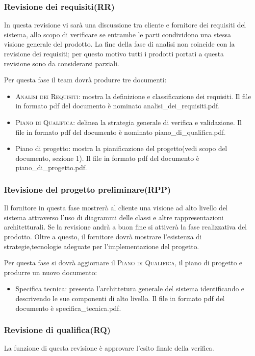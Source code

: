 \documentclass[11pt,a4paper]{article}
\begin{document}
\subsubsection{Revisione dei requisiti(RR)}
In questa revisione vi sarà una discussione tra cliente e fornitore dei requisiti del sistema, allo scopo di verificare se entrambe le parti condividono una stessa visione generale del prodotto.
La fine della fase di analisi non coincide con la revisione dei requisiti; per questo motivo tutti i prodotti portati a questa revisione sono da considerarsi parziali.

Per questa fase il team dovrà produrre tre documenti:
\begin{itemize}
\item \textsc{Analisi dei Requisiti}: mostra la definizione e classificazione dei requisiti. Il file in formato pdf del documento è nominato analisi\_dei\_requisiti.pdf. 
\item \textsc{Piano di Qualifica}: delinea la strategia generale di verifica e validazione. Il file in formato pdf del documento è nominato piano\_di\_qualifica.pdf.  
\item Piano di progetto: mostra la pianificazione del progetto(vedi scopo del documento, sezione 1). Il file in formato pdf del documento è piano\_di\_progetto.pdf. 
\end{itemize}
\subsubsection{Revisione del progetto preliminare(RPP)}
Il fornitore in questa fase mostrerà al cliente una visione ad alto livello del sistema attraverso l'uso di diagrammi delle classi e altre rappresentazioni architetturali.
Se la revisione andrà a buon fine si attiverà la fase realizzativa del prodotto.
Oltre a questo, il fornitore dovrà mostrare l'esistenza di strategie,tecnologie adeguate per l'implementazione del progetto.

Per questa fase si dovrà aggiornare il \textsc{Piano di Qualifica}, il piano di progetto e produrre un nuovo documento:
\begin{itemize}
\item Specifica tecnica: presenta l'archittetura generale del sistema identificando e descrivendo le sue componenti di alto livello. Il file in formato pdf del documento è specifica\_tecnica.pdf. 
\end{itemize}
\subsubsection{Revisione di qualifica(RQ)}
La funzione di questa revisione è approvare l'esito finale della verifica.
\end{document}
